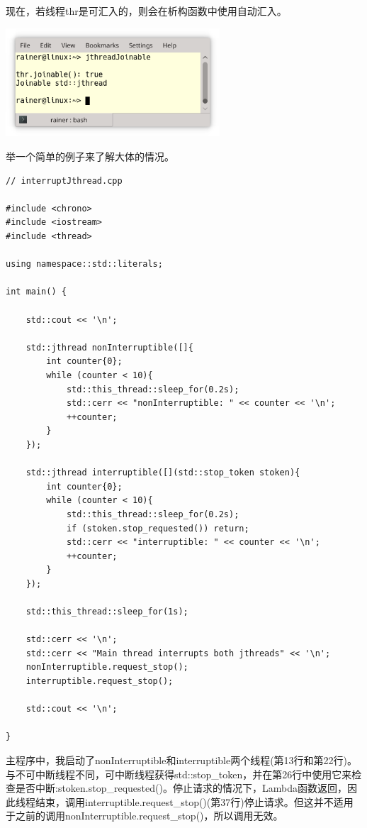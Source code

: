 现在，若线程thr是可汇入的，则会在析构函数中使用自动汇入。

\begin{center}
\includegraphics[width=0.6\textwidth]{content/3/chapter6/images/26.png}\\
\end{center}


举一个简单的例子来了解大体的情况。

\begin{lstlisting}[style=styleCXX]
// interruptJthread.cpp

#include <chrono>
#include <iostream>
#include <thread>

using namespace::std::literals;

int main() {

	std::cout << '\n';
	
	std::jthread nonInterruptible([]{
		int counter{0};
		while (counter < 10){
			std::this_thread::sleep_for(0.2s);
			std::cerr << "nonInterruptible: " << counter << '\n';
			++counter;
		}
	});
	
	std::jthread interruptible([](std::stop_token stoken){
		int counter{0};
		while (counter < 10){
			std::this_thread::sleep_for(0.2s);
			if (stoken.stop_requested()) return;
			std::cerr << "interruptible: " << counter << '\n';
			++counter;
		}
	});
	
	std::this_thread::sleep_for(1s);
	
	std::cerr << '\n';
	std::cerr << "Main thread interrupts both jthreads" << '\n';
	nonInterruptible.request_stop();
	interruptible.request_stop();
	
	std::cout << '\n';

}
\end{lstlisting}

主程序中，我启动了nonInterruptible和interruptible两个线程(第13行和第22行)。与不可中断线程不同，可中断线程获得std::stop\_token，并在第26行中使用它来检查是否中断:stoken.stop\_requested()。停止请求的情况下，Lambda函数返回，因此线程结束，调用interruptible.request\_stop()(第37行)停止请求。但这并不适用于之前的调用nonInterruptible.request\_stop()，所以调用无效。

